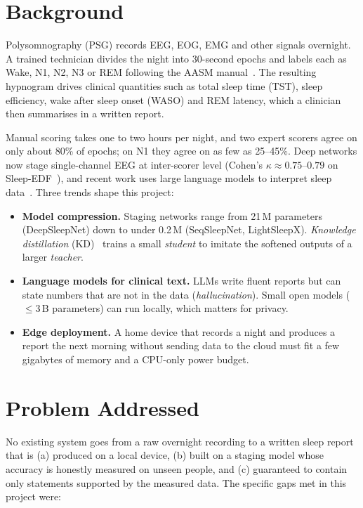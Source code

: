 \section{Background}

Polysomnography (PSG) records EEG, EOG, EMG and other signals overnight. A trained technician divides the night
into 30-second epochs and labels each as Wake, N1, N2, N3 or REM following the AASM manual~\cite{aasm}. The
resulting hypnogram drives clinical quantities such as total sleep time (TST), sleep efficiency, wake after sleep
onset (WASO) and REM latency, which a clinician then summarises in a written report.

Manual scoring takes one to two hours per night, and two expert scorers agree on only about 80\% of epochs; on N1
they agree on as few as 25--45\%. Deep networks now stage single-channel EEG at inter-scorer level (Cohen's
$\kappa \approx 0.75$--$0.79$ on Sleep-EDF~\cite{supratak2017deepsleepnet,supratak2020tinysleepnet,phan2022sleeptransformer}),
and recent work uses large language models to interpret sleep data~\cite{sleepvlm,sleeplm,chatgptpsg}. Three trends
shape this project:

\begin{itemize}
  \item \textbf{Model compression.} Staging networks range from 21\,M parameters (DeepSleepNet) down to under
  0.2\,M (SeqSleepNet, LightSleepX). \emph{Knowledge distillation} (KD)~\cite{hinton2015distilling} trains a small
  \emph{student} to imitate the softened outputs of a larger \emph{teacher}.
  \item \textbf{Language models for clinical text.} LLMs write fluent reports but can state numbers that are not in
  the data (\emph{hallucination}). Small open models ($\le$3\,B parameters) can run locally, which matters for
  privacy.
  \item \textbf{Edge deployment.} A home device that records a night and produces a report the next morning without
  sending data to the cloud must fit a few gigabytes of memory and a CPU-only power budget.
\end{itemize}

\section{Problem Addressed}

No existing system goes from a raw overnight recording to a written sleep report that is (a) produced on a local
device, (b) built on a staging model whose accuracy is honestly measured on unseen people, and (c) guaranteed to
contain only statements supported by the measured data. The specific gaps met in this project were:


